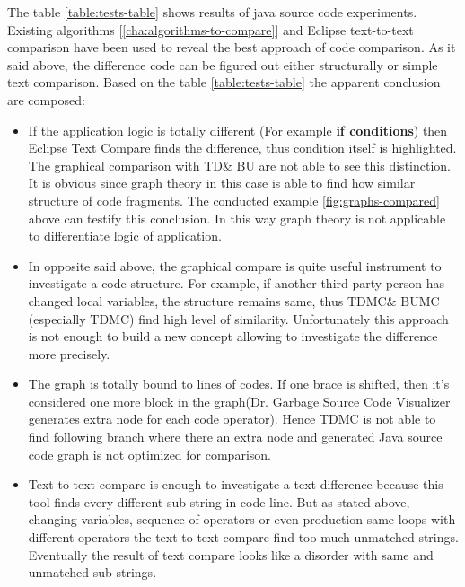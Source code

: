 \documentclass{report}
\begin{document}
The table \ref{table:tests-table} shows results of java source code experiments. Existing algorithms [\ref{cha:algorithms-to-compare}] and Eclipse text-to-text comparison have been used to reveal the best approach of code comparison. As it said above, the difference code can be figured out either structurally or simple text comparison. Based on the table \ref{table:tests-table} the apparent conclusion are composed:

\begin{itemize}
	\item If the application logic is totally different (For example \textbf{if conditions}) then Eclipse Text Compare finds the difference, thus condition itself is highlighted. The graphical comparison with TD\& BU are not able to see this distinction. It is obvious since graph theory in this case is able to find 
how similar structure of code fragments. The conducted example \ref{fig:graphs-compared} above can testify this conclusion. In this way graph theory is not applicable to differentiate logic of application.
	
	\item In opposite said above, the graphical compare is quite useful instrument to investigate a code structure. For example, if another third party person has changed local variables, the structure remains same, thus TDMC\& BUMC (especially TDMC) find high level of similarity. Unfortunately this approach is not enough to build a new concept allowing to investigate the difference more precisely.
	
	\item The graph is totally bound to lines of codes. If one brace is shifted, then it's considered one more block in the graph(Dr. Garbage Source Code Visualizer \cite{drgarbage} generates extra node for each code operator). Hence TDMC is not able to find following branch where there an extra node and generated Java source code graph is not optimized for comparison.
	
	\item Text-to-text compare is enough to investigate a text difference because this tool finds every different sub-string in code line. But as stated above, changing variables, sequence of operators or even production same loops with different operators the text-to-text compare find too much unmatched strings. Eventually the result of text compare looks like a disorder with same and unmatched sub-strings.  	
	

\end{itemize}
\end{document}
